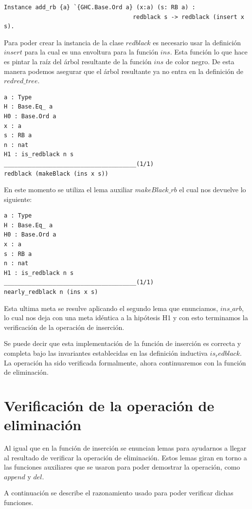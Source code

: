 \documentclass[8pt,leqno,pdflatex,spanish]{book}
\theoremstyle{plain}
\theoremstyle{definition}
\theoremstyle{remark}
\begin{document}
\begin{verbatim}
Instance add_rb {a} `{GHC.Base.Ord a} (x:a) (s: RB a) :
                                     redblack s -> redblack (insert x s).
\end{verbatim}

Para poder crear la instancia de la clase $redblack$ es necesario usar la definici\'on $insert$ 
para la cual es una envoltura para la funci\'on $ins$. Esta funci\'on lo que hace es pintar la 
ra\'iz del \'arbol resultante de la funci\'on $ins$ de color negro. De esta manera podemos 
asegurar que el \'arbol resultante ya no entra en la definici\'on de $redred\_tree$.

\begin{verbatim}
a : Type
H : Base.Eq_ a
H0 : Base.Ord a
x : a
s : RB a
n : nat
H1 : is_redblack n s
______________________________________(1/1)
redblack (makeBlack (ins x s))
\end{verbatim}

En este momento se utiliza el lema auxiliar $makeBlack\_rb$ el cual nos devuelve lo siguiente:

\begin{verbatim}
a : Type
H : Base.Eq_ a
H0 : Base.Ord a
x : a
s : RB a
n : nat
H1 : is_redblack n s
______________________________________(1/1)
nearly_redblack n (ins x s)
\end{verbatim}

Esta ultima meta se resulve aplicando el segundo lema que enunciamos, $ins\_arb$, lo cual nos deja 
con una meta idéntica a la hipótesis H1 y con esto terminamos la verificaci\'on de la operaci\'on 
de inserci\'on.

Se puede decir que esta implementaci\'on de la funci\'on de inserci\'on es correcta y completa 
bajo las invariantes establecidas en las definici\'on inductiva $is_redblack$. La operaci\'on ha 
sido verificada formalmente, ahora continuaremos con la funci\'on de eliminaci\'on.  

\section{Verificación de la operación de eliminación}
Al igual que en la funci\'on de inserci\'on se enuncian lemas para ayudarnos a llegar al resultado 
de verificar la operación de eliminación. Estos lemas giran en torno a las funciones auxiliares 
que se usaron para poder demostrar la operación, como $append$ y $del$.

A continuación se describe el razonamiento usado para poder verificar dichas funciones.
\end{document}
